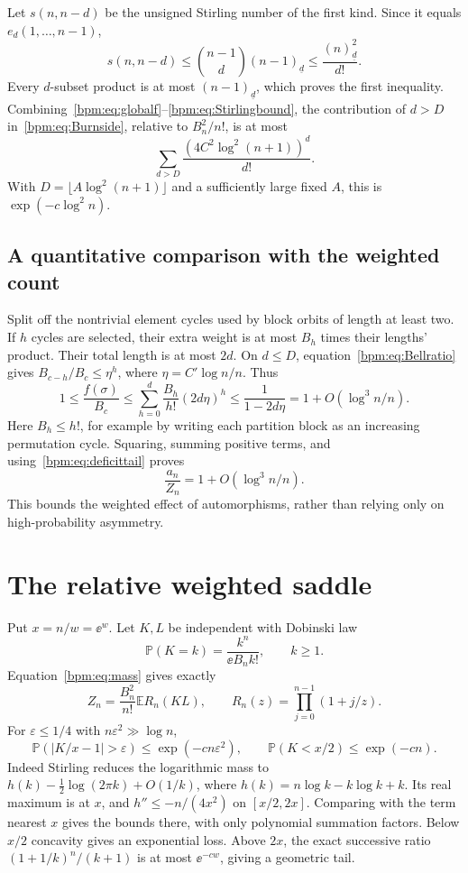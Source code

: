 \documentclass[11pt,a4paper]{article}
\theoremstyle{remark}\newtheorem{remark}[theorem]{Remark}%
\newcommand{\E}{\mathbb E}\newcommand{\Pp}{\mathbb P}
\newcommand{\fall}[2]{(#1)_{\underline{#2}}}\newcommand{\rise}[2]{(#1)^{\overline{#2}}}
\begin{document}
Let $s(n,n-d)$ be the unsigned Stirling number of the first kind. Since it equals $e_d(1,\ldots,n-1)$,
\begin{equation}\label{bpm:eq:Stirlingbound}
 s(n,n-d)\le\binom{n-1}{d}\fall{n-1}{d}
             \le\frac{\fall nd^2}{d!}.
\end{equation}
Every $d$-subset product is at most $\fall{n-1}{d}$, which proves the first inequality. Combining~\eqref{bpm:eq:globalf}--\eqref{bpm:eq:Stirlingbound}, the contribution of $d>D$ in~\eqref{bpm:eq:Burnside}, relative to $B_n^2/n!$, is at most
\begin{equation}\label{bpm:eq:deficittail}
 \sum_{d>D}\frac{(4C^2\log^2(n+1))^d}{d!}.
\end{equation}
With $D=\lfloor A\log^2(n+1)\rfloor$ and a sufficiently large fixed $A$, this is $\exp(-c\log^2n)$.

\subsection*{A quantitative comparison with the weighted count}
Split off the nontrivial element cycles used by block orbits of length at least two. If $h$ cycles are selected, their extra weight is at most $B_h$ times their lengths' product. Their total length is at most $2d$. On $d\le D$, equation~\eqref{bpm:eq:Bellratio} gives $B_{c-h}/B_c\le\eta^h$, where $\eta=C'\log n/n$. Thus
\[
 1\le\frac{f(\sigma)}{B_c}
 \le\sum_{h=0}^d\frac{B_h}{h!}(2d\eta)^h
 \le\frac1{1-2d\eta}=1+O(\log^3n/n).
\]
Here $B_h\le h!$, for example by writing each partition block as an increasing permutation cycle. Squaring, summing positive terms, and using~\eqref{bpm:eq:deficittail} proves
\begin{equation}\label{bpm:eq:asymmetry}
 \frac{a_n}{Z_n}=1+O(\log^3n/n).
\end{equation}
This bounds the weighted effect of automorphisms, rather than relying only on high-probability asymmetry.

\section{The relative weighted saddle}
Put $x=n/w=\ee^w$. Let $K,L$ be independent with Dobinski law
\[
 \Pp(K=k)=\frac{k^n}{\ee B_n k!},\qquad k\ge1.
\]
Equation~\eqref{bpm:eq:mass} gives exactly
\begin{equation}\label{bpm:eq:Dobinski}
 Z_n=\frac{B_n^2}{n!}\E R_n(KL),\qquad
 R_n(z)=\prod_{j=0}^{n-1}(1+j/z).
\end{equation}
For $\varepsilon\le1/4$ with $n\varepsilon^2\gg\log n$,
\begin{equation}\label{bpm:eq:concentrate}
 \Pp(|K/x-1|>\varepsilon)\le\exp(-c n\varepsilon^2),
 \qquad \Pp(K<x/2)\le\exp(-c n).
\end{equation}
Indeed Stirling reduces the logarithmic mass to
$h(k)-\tfrac12\log(2\pi k)+O(1/k)$, where
$h(k)=n\log k-k\log k+k$. Its real maximum is at $x$, and
$h''\le-n/(4x^2)$ on $[x/2,2x]$. Comparing with the term nearest $x$ gives the bounds there, with only polynomial summation factors. Below $x/2$ concavity gives an exponential loss. Above $2x$, the exact successive ratio $(1+1/k)^n/(k+1)$ is at most $\ee^{-cw}$, giving a geometric tail.
\end{document}
